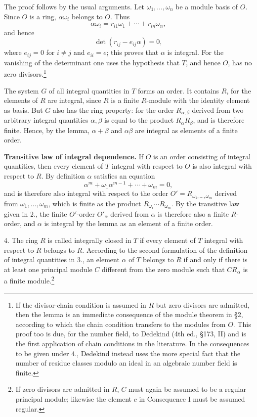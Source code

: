 \documentclass[11pt]{article}
\begin{document}
The proof follows by the usual arguments. Let $\omega_1,\ldots,\omega_n$ be a
module basis of $O$. Since $O$ is a ring, $\alpha\omega_i$ belongs to $O$. Thus
\[
        \alpha\omega_i=r_{i1}\omega_1+\cdots+r_{in}\omega_n,
\]
and hence
\[
        \det(r_{ij}-e_{ij}\alpha)=0,
\]
where $e_{ij}=0$ for $i\ne j$ and $e_{ii}=e$; this proves that $\alpha$ is integral.
For the vanishing of the determinant one uses the hypothesis that $T$, and hence
$O$, has no zero divisors.\footnote{If the divisor-chain condition is assumed in
$R$ but zero divisors are admitted, then the lemma is an immediate consequence of
the module theorem in §2, according to which the chain condition transfers to the
modules from $O$. This proof too is due, for the number field, to Dedekind
(4th ed., §173, II) and is the first application of chain conditions in the literature.
In the consequences to be given under 4., Dedekind instead uses the more special
fact that the number of residue classes modulo an ideal in an algebraic number
field is finite.}

The system $G$ of all integral quantities in $T$ forms an order. It contains $R$,
for the elements of $R$ are integral, since $R$ is a finite $R$-module with the
identity element as basis. But $G$ also has the ring property: for the order
$R_{\alpha,\beta}$ derived from two arbitrary integral quantities $\alpha,\beta$ is equal
to the product $R_\alpha R_\beta$, and is therefore finite. Hence, by the lemma,
$\alpha+\beta$ and $\alpha\beta$ are integral as elements of a finite order.

\medskip
\noindent\textbf{Transitive law of integral dependence.} If $O$ is an order consisting
of integral quantities, then every element of $T$ integral with respect to $O$ is also
integral with respect to $R$. By definition $\alpha$ satisfies an equation
\[
        \alpha^m+\omega_1\alpha^{m-1}+\cdots+\omega_m=0,
\]
and is therefore also integral with respect to the order
$O'=R_{\omega_1,\ldots,\omega_m}$ derived from $\omega_1,\ldots,\omega_m$, which
is finite as the product $R_{\omega_1}\cdots R_{\omega_m}$. By the transitive law
given in 2., the finite $O'$-order $O'_\alpha$ derived from $\alpha$ is therefore
also a finite $R$-order, and $\alpha$ is integral by the lemma as an element of a
finite order.

4. The ring $R$ is called integrally closed in $T$ if every element of $T$ integral
with respect to $R$ belongs to $R$. According to the second formulation of the
definition of integral quantities in 3., an element $\alpha$ of $T$ belongs to $R$ if
and only if there is at least one principal module $C$ different from the zero module
such that $CR_\alpha$ is a finite module.\footnote{If zero divisors are admitted in
$R$, $C$ must again be assumed to be a regular principal module; likewise the
element $c$ in Consequence I must be assumed regular.}
\end{document}
